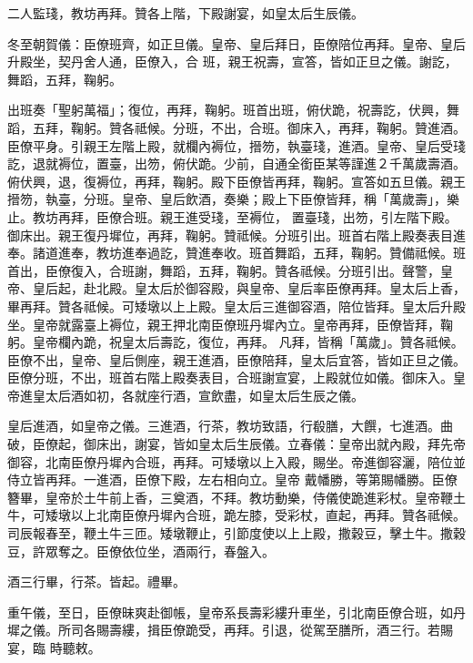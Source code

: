 \begin{pinyinscope}
 二人監琖，教坊再拜。贊各上階，下殿謝宴，如皇太后生辰儀。



 冬至朝賀儀：臣僚班齊，如正旦儀。皇帝、皇后拜日，臣僚陪位再拜。皇帝、皇后升殿坐，契丹舍人通，臣僚入，合
 班，親王祝壽，宣答，皆如正旦之儀。謝訖，舞蹈，五拜，鞠躬。



 出班奏「聖躬萬福」；復位，再拜，鞠躬。班首出班，俯伏跪，祝壽訖，伏興，舞蹈，五拜，鞠躬。贊各祗候。分班，不出，合班。御床入，再拜，鞠躬。贊進酒。臣僚平身。引親王左階上殿，就欄內褥位，搢笏，執臺琖，進酒。皇帝、皇后受琖訖，退就褥位，置臺，出笏，俯伏跪。少前，自通全銜臣某等謹進２千萬歲壽酒。俯伏興，退，復褥位，再拜，鞠躬。殿下臣僚皆再拜，鞠躬。宣答如五旦儀。親王搢笏，執臺，分班。皇帝、皇后飲酒，奏樂；殿上下臣僚皆拜，稱「萬歲壽」，樂止。教坊再拜，臣僚合班。親王進受琖，至褥位，
 置臺琖，出笏，引左階下殿。御床出。親王復丹墀位，再拜，鞠躬。贊祗候。分班引出。班首右階上殿奏表目進奉。諸道進奉，教坊進奉過訖，贊進奉收。班首舞蹈，五拜，鞠躬。贊備祗候。班首出，臣僚復入，合班謝，舞蹈，五拜，鞠躬。贊各祗候。分班引出。聲警，皇帝、皇后起，赴北殿。皇太后於御容殿，與皇帝、皇后率臣僚再拜。皇太后上香，畢再拜。贊各祗候。可矮墩以上上殿。皇太后三進御容酒，陪位皆拜。皇太后升殿坐。皇帝就露臺上褥位，親王押北南臣僚班丹墀內立。皇帝再拜，臣僚皆拜，鞠躬。皇帝欄內跪，祝皇太后壽訖，復位，再拜。
 凡拜，皆稱「萬歲」。贊各祗候。臣僚不出，皇帝、皇后側座，親王進酒，臣僚陪拜，皇太后宜答，皆如正旦之儀。臣僚分班，不出，班首右階上殿奏表目，合班謝宣宴，上殿就位如儀。御床入。皇帝進皇太后酒如初，各就座行酒，宣飲盡，如皇太后生辰之儀。



 皇后進酒，如皇帝之儀。三進酒，行茶，教坊致語，行殽膳，大饌，七進酒。曲破，臣僚起，御床出，謝宴，皆如皇太后生辰儀。立春儀：皇帝出就內殿，拜先帝御容，北南臣僚丹墀內合班，再拜。可矮墩以上入殿，賜坐。帝進御容灑，陪位並侍立皆再拜。一進酒，臣僚下殿，左右相向立。皇帝
 戴幡勝，等第賜幡勝。臣僚簪畢，皇帝於土牛前上香，三奠酒，不拜。教坊動樂，侍儀使跪進彩杖。皇帝鞭土牛，可矮墩以上北南臣僚丹墀內合班，跪左膝，受彩杖，直起，再拜。贊各祗候。司辰報春至，鞭土牛三匝。矮墩鞭止，引節度使以上上殿，撒穀豆，擊土牛。撒穀豆，許眾奪之。臣僚依位坐，酒兩行，春盤入。



 酒三行畢，行茶。皆起。禮畢。



 重午儀，至日，臣僚昧爽赴御帳，皇帝系長壽彩縷升車坐，引北南臣僚合班，如丹墀之儀。所司各賜壽縷，揖臣僚跪受，再拜。引退，從駕至膳所，酒三行。若賜宴，臨
 時聽敕。




\end{pinyinscope}
